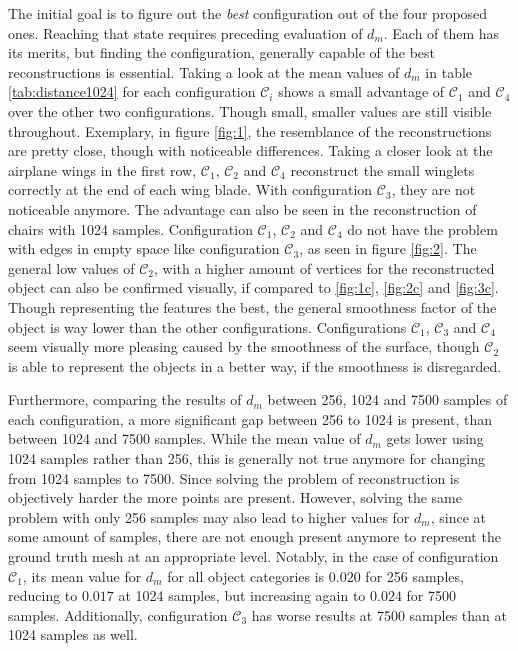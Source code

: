    The initial goal is to figure out the \emph{best} configuration out of the four proposed ones.
    Reaching that state requires preceding evaluation of $d_m$. Each of them has its merits, but finding the configuration,
    generally capable of the best reconstructions is essential. 
    Taking a look at the mean values of $d_m$ in table \ref{tab:distance1024} for each configuration $\mathcal{C}_i$  shows a small 
    advantage of $\mathcal{C}_1$ and $\mathcal{C}_4$ over the other two configurations. 
    Though small, smaller values are still visible throughout. 
    Exemplary, in figure \ref{fig:1}, the resemblance of the reconstructions are pretty close, though with noticeable differences.
    Taking a closer look at the airplane wings in the first row, $\mathcal{C}_1$, $\mathcal{C}_2$ and $\mathcal{C}_4$ reconstruct
    the small winglets correctly at the end of each wing blade. With configuration $\mathcal{C}_3$, they are not noticeable anymore.
    The advantage can also be seen in the reconstruction of chairs with 1024 samples.  Configuration $\mathcal{C}_1$, $\mathcal{C}_2$
    and $\mathcal{C}_4$ do not have the problem with edges in empty space like configuration $\mathcal{C}_3$, as seen in figure \ref{fig:2}.
    The general low values of $\mathcal{C}_2$, with a higher amount of vertices for the reconstructed object can also be confirmed visually,
    if compared to \ref{fig:1c}, \ref{fig:2c} and \ref{fig:3c}. Though representing the features the best, the general smoothness factor of the object is 
    way lower than the other configurations. Configurations $\mathcal{C}_1$, $\mathcal{C}_3$ and $\mathcal{C}_4$ seem visually more pleasing caused by the smoothness of the surface, though 
    $\mathcal{C}_2$ is able to represent the objects in a better way, if the smoothness is disregarded.

    Furthermore, comparing the results of $d_m$ between 256, 1024 and 7500 samples of each configuration, a more significant gap 
    between 256 to 1024 is present, than between 1024 and 7500 samples.
    While the mean value of $d_m$ gets lower using 1024 samples rather than 256, this is generally not true anymore for changing 
    from 1024 samples to 7500. Since solving the problem of reconstruction is objectively harder the more points are present. 
    However, solving the same problem with only 256 samples may also lead to higher values for $d_m$, since at some amount of samples, there are not enough present
    anymore to represent the ground truth mesh at an appropriate level.
    Notably, in the case of configuration $\mathcal{C}_1$, its mean value for $d_m$ for all object categories is $0.020$ for 256 samples,
    reducing to $0.017$ at 1024 samples, but increasing again to $0.024$ for 7500 samples. Additionally, configuration $\mathcal{C}_3$
    has worse results at 7500 samples than at 1024 samples as well.

